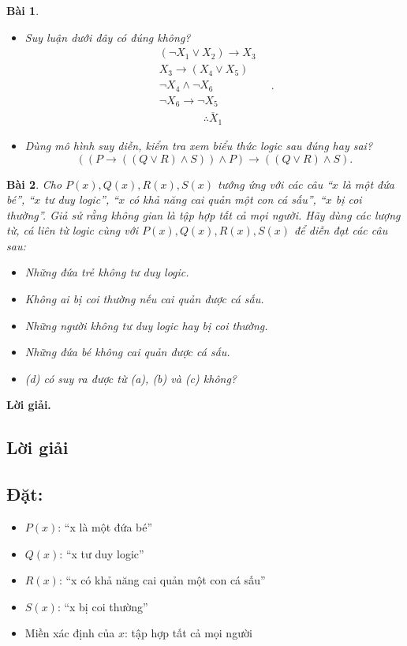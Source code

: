 \documentclass[11pt, oneside,openright,a4paper]{book}
\newtheorem{bt}{Bài }[section]
\begin{document}
\begin{bt}
\begin{itemize}
\item[a)] Suy luận dưới đây có đúng không?
    $$\begin{matrix}
        (\lnot X_1 \lor X_2) \rightarrow X_3\\
        X_3 \rightarrow (X_4 \lor X_5)\\
        \lnot X_4 \land \lnot X_6\\
        \lnot X_6 \rightarrow \lnot X_5\\
        \overline{\qquad \qquad \therefore X_1 \qquad \qquad}
    \end{matrix}.$$
    \item[b)] Dùng mô hình suy diễn, kiểm tra xem biểu thức logic sau đúng hay sai?
    $$((P \rightarrow ((Q \lor R) \land S)) \land P) \rightarrow ((Q \lor R) \land S).$$
\end{itemize}
\end{bt}
\begin{bt}
Cho $P(x), Q(x), R(x), S(x)$ tướng ứng với các câu ``$x$ là một đứa bé'', ``$x$ tư duy logic'', ``$x$ có khả năng cai quản một con cá sấu'', ``$x$ bị coi thường''. Giả sử rằng không gian là tập hợp tất cả mọi người. Hãy dùng các lượng từ, cá liên từ logic cùng với $P(x), Q(x), R(x), S(x)$ để diễn đạt các câu sau:
\begin{itemize}
\item[a)] Những đứa trẻ không tư duy logic.
\item[b)] Không ai bị coi thường nếu cai quản được cá sấu.
\item[c)] Những người không tư duy logic hay bị coi thường.
\item[d)] Những đứa bé không cai quản được cá sấu.
\item[e)] (d) có suy ra được từ (a), (b) và (c) không?
\end{itemize}
\end{bt}

{\bf Lời giải.} 
\subsection*{Lời giải}

\subsection*{Đặt:}
\begin{itemize}
    \item $P(x)$: ``x là một đứa bé''
    \item $Q(x)$: ``x tư duy logic''
    \item $R(x)$: ``x có khả năng cai quản một con cá sấu''
    \item $S(x)$: ``x bị coi thường''
    \item Miền xác định của $x$: tập hợp tất cả mọi người
\end{itemize}
\end{document}
